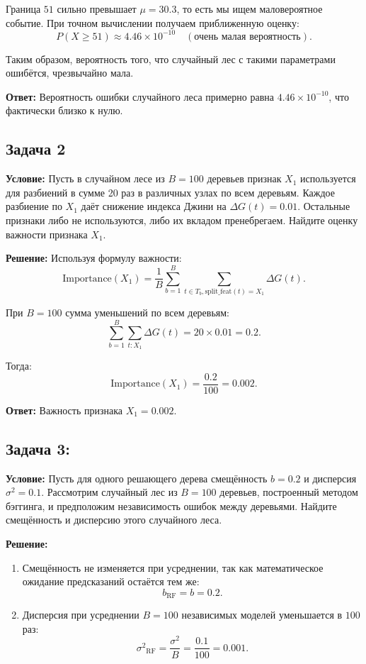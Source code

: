 Граница \(51\) сильно превышает \(\mu=30.3\), то есть мы ищем маловероятное событие. При точном вычислении получаем приближенную оценку:
\[
P(X \geq 51) \approx 4.46 \times 10^{-10} \quad (\text{очень малая вероятность}).
\]

Таким образом, вероятность того, что случайный лес с такими параметрами ошибётся, чрезвычайно мала.

\textbf{Ответ:} Вероятность ошибки случайного леса примерно равна \(4.46 \times 10^{-10}\), что фактически близко к нулю.


\subsection*{Задача 2}

\textbf{Условие:} Пусть в случайном лесе из \(B = 100\) деревьев признак \(X_1\) используется для разбиений в сумме 20 раз в различных узлах по всем деревьям. Каждое разбиение по \(X_1\) даёт снижение индекса Джини на \(\Delta G(t) = 0.01\). Остальные признаки либо не используются, либо их вкладом пренебрегаем. Найдите оценку важности признака \(X_1\).

\textbf{Решение:} Используя формулу важности:
\[
\text{Importance}(X_1) = \frac{1}{B} \sum_{b=1}^B \sum_{t \in T_b, \text{split\_feat}(t)=X_1} \Delta G(t).
\]

При \(B = 100\) сумма уменьшений по всем деревьям:
\[
\sum_{b=1}^B \sum_{t: X_1} \Delta G(t) = 20 \times 0.01 = 0.2.
\]

Тогда:
\[
\text{Importance}(X_1) = \frac{0.2}{100} = 0.002.
\]

\textbf{Ответ:} Важность признака \(X_1 = 0.002.\)


\subsection*{Задача 3:}

\textbf{Условие:} Пусть для одного решающего дерева смещённость \(b = 0.2\) и дисперсия \(\sigma^2 = 0.1\). Рассмотрим случайный лес из \(B = 100\) деревьев, построенный методом бэггинга, и предположим независимость ошибок между деревьями. Найдите смещённость и дисперсию этого случайного леса.

\textbf{Решение:}
\begin{enumerate}
    \item Смещённость не изменяется при усреднении, так как математическое ожидание предсказаний остаётся тем же:
    \[
    b_{\text{RF}} = b = 0.2.
    \]
    \item Дисперсия при усреднении \(B = 100\) независимых моделей уменьшается в \(100\) раз:
    \[
    {\sigma^2}_{\text{RF}} = \frac{\sigma^2}{B} = \frac{0.1}{100} = 0.001.
    \]
\end{enumerate}

